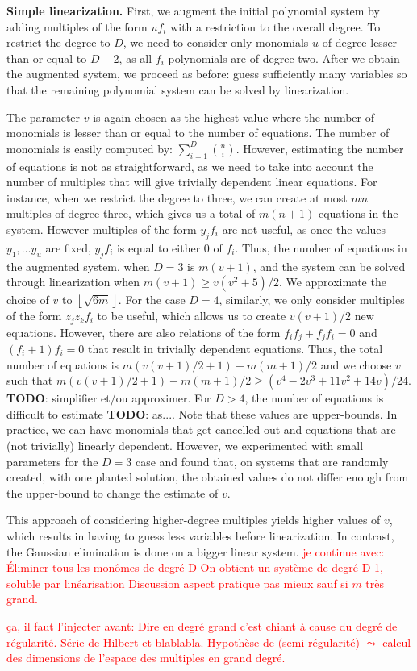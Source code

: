 \documentclass[a4paper,UKenglish,cleveref, autoref]{lipics-v2019}
\newcommand{\red}{\color{red}}
\newcommand{\TODO}[1]{{\red \textbf{TODO}:} #1\xspace}
\begin{document}
\noindent
\textbf{Simple linearization.} 
First, we augment the initial polynomial system by adding multiples of the form $uf_i$ with a restriction to the overall degree. To restrict the degree to $D$, we need to consider only monomials $u$ of degree lesser than or equal to $D-2$, as all $f_i$ polynomials are of degree two. After we obtain the augmented system, we proceed as before: guess sufficiently many variables so that the remaining polynomial system can be solved by linearization. 

The parameter $v$ is again chosen as the highest value where the number of monomials is lesser than or equal to the number of equations. The number of monomials is easily computed by: $\sum_{i=1}^{D}\binom{n}{i}$. However, estimating the number of equations is not as straightforward, as we need to take into account the number of multiples that will give trivially dependent linear equations. For instance, when we restrict the degree to three, we can create at most $mn$ multiples of degree three, which gives us a total of $m(n+1)$ equations in the system. However multiples of the form $y_jf_i$ are not useful, as once the values $y_1,\dots y_u$ are fixed, $y_jf_i$ is equal to either 0 of $f_i$. Thus, the number of equations in the augmented system, when $D=3$ is $m(v+1)$, and the system can be solved through linearization when $m(v+1) \geq v(v^2+5)/2$. We approximate the choice of $v$ to $\left\lfloor \sqrt{6m} \right\rfloor$. For the case $D=4$, similarly, we only consider multiples of the form $z_jz_kf_i$ to be useful, which allows us to create $v(v+1)/2$ new equations. However, there are also relations of the form $f_if_j + f_jf_i=0$ and $(f_i+1)f_i=0$ that result in trivially dependent equations. Thus, the total number of equations is $m(v(v+1)/2+1)-m(m+1)/2$ and we choose $v$ such that $m(v(v+1)/2+1)-m(m+1)/2 \geq (v^4-2v^3+11v^2+14v)/24$. \TODO{simplifier et/ou approximer}. For $D > 4$, the number of equations is difficult to estimate \TODO{as...}. Note that these values are upper-bounds. In practice, we can have monomials that get cancelled out and equations that are (not trivially) linearly dependent. However, we experimented with small parameters for the $D=3$ case and found that, on systems that are randomly created, with one planted solution, the obtained values do not differ enough from the upper-bound to change the estimate of $v$. 


This approach of considering higher-degree multiples yields higher values of $v$, which results in having to guess less variables before linearization. In contrast, the Gaussian elimination is done on a bigger linear system. 
\textcolor{red}{je continue avec:
	Éliminer tous les monômes de degré D
	On obtient un système de degré D-1, soluble par linéarisation
	Discussion aspect pratique pas mieux sauf si $m$ très grand.
}

\textcolor{red}{ça, il faut l'injecter avant:
	Dire en degré grand c'est chiant à cause du degré de régularité. Série de Hilbert et blablabla. Hypothèse de (semi-régularité) $\leadsto$ calcul des dimensions de l'espace des multiples en grand degré.}





\end{document}
